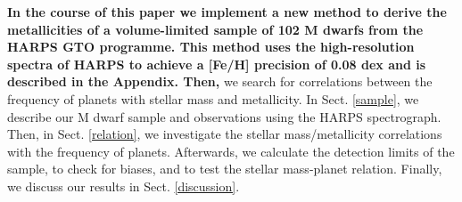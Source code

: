 \documentclass[structabstract]{aa}
\begin{document}



\textbf{In the course of this paper we implement a new method to derive the metallicities of \textbf{a volume-limited} sample of 102 M dwarfs from the HARPS GTO programme. This method uses the high-resolution spectra of HARPS to achieve a [Fe/H] precision of 0.08 dex and is described in the Appendix. Then,} we
search for correlations between the frequency of planets with stellar mass and metallicity. In Sect. \ref{sample}, we describe our M dwarf sample and observations using the HARPS spectrograph. Then, in Sect. \ref{relation}, we investigate the stellar mass/metallicity correlations with the frequency of planets. Afterwards, we calculate the detection limits of the sample, to check for biases, and to test the stellar mass-planet relation.
Finally, we discuss our results in Sect. \ref{discussion}.
\end{document}
